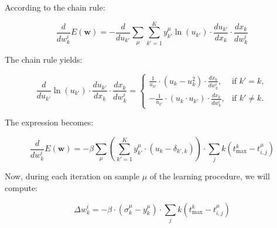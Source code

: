 According to the chain rule:

\begin{equation}
    \frac{d}{dw_k^i} E(\mathbf{w}) = -\frac{d}{du_{k'}} \sum_\mu \sum_{k'=1}^K y_{k'}^\mu \ln(u_{k'}) \cdot \frac{du_{k'}}{dx_k} \cdot \frac{dx_k}{dw_k^i}
\end{equation}

The chain rule yields:

\begin{equation}
    \frac{d}{du_{k'}} \ln(u_{k'}) \cdot \frac{du_{k'}}{dx_k} \cdot \frac{dx_k}{dw_k^i} = \begin{cases}
    \frac{1}{u_{k'}} \cdot (u_k - u_k^2) \cdot \frac{dx_k}{dw_k^i}, & \text{if } k' = k, \\
    -\frac{1}{u_{k'}} \cdot (u_k \cdot u_{k'}) \cdot \frac{dx_k}{dw_k^i}, & \text{if } k' \neq k.
    \end{cases}
\end{equation}

The expression becomes:

\begin{equation}
    \frac{d}{dw_k^i} E(\mathbf{w}) = -\beta \sum_\mu \left(\sum_{k'=1}^K y_{k'}^\mu \cdot (u_k - \delta_{k',k})\right) \cdot \sum_j k(t_{\max}^k - t_{i,j}^\mu)
\end{equation}

Now, during each iteration on sample \(\mu\) of the learning procedure, we will compute:

\begin{equation}
    \Delta w_k^i = -\beta \cdot (\sigma_k^\mu - y_k^\mu) \cdot \sum_j k(t_{\max}^k - t_{i,j}^\mu)
\end{equation}
